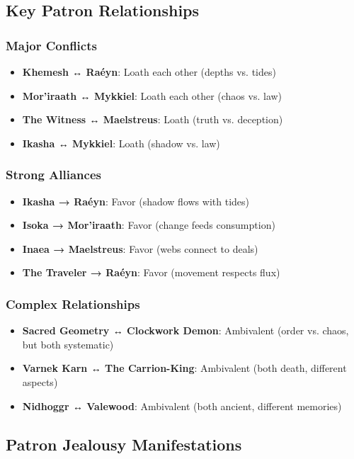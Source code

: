 \documentclass[12pt,twoside]{book}
\begin{document}
\subsection{Key Patron Relationships}

\subsubsection{Major Conflicts}
\begin{itemize}
\item \textbf{Khemesh ↔ Raéyn}: Loath each other (depths vs. tides)
\item \textbf{Mor'iraath ↔ Mykkiel}: Loath each other (chaos vs. law)
\item \textbf{The Witness ↔ Maelstreus}: Loath (truth vs. deception)
\item \textbf{Ikasha ↔ Mykkiel}: Loath (shadow vs. law)
\end{itemize}

\subsubsection{Strong Alliances}
\begin{itemize}
\item \textbf{Ikasha → Raéyn}: Favor (shadow flows with tides)
\item \textbf{Isoka → Mor'iraath}: Favor (change feeds consumption)
\item \textbf{Inaea → Maelstreus}: Favor (webs connect to deals)
\item \textbf{The Traveler → Raéyn}: Favor (movement respects flux)
\end{itemize}

\subsubsection{Complex Relationships}
\begin{itemize}
\item \textbf{Sacred Geometry ↔ Clockwork Demon}: Ambivalent (order vs. chaos, but both systematic)
\item \textbf{Varnek Karn ↔ The Carrion-King}: Ambivalent (both death, different aspects)
\item \textbf{Nidhoggr ↔ Valewood}: Ambivalent (both ancient, different memories)
\end{itemize}

\subsection{Patron Jealousy Manifestations}
\end{document}
